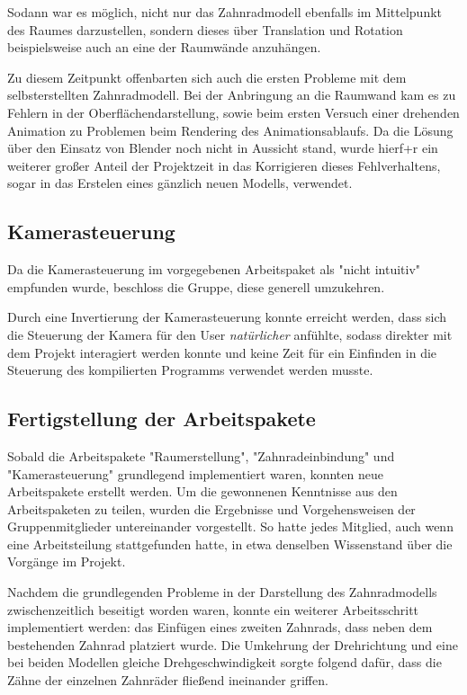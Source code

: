 \documentclass{article}
\begin{document}
Sodann war es möglich, nicht nur das Zahnradmodell ebenfalls im Mittelpunkt des Raumes darzustellen, sondern dieses über Translation und Rotation beispielsweise auch an eine der Raumwände anzuhängen. 

Zu diesem Zeitpunkt offenbarten sich auch die ersten Probleme mit dem selbsterstellten Zahnradmodell. 
Bei der Anbringung an die Raumwand kam es zu Fehlern in der Oberflächendarstellung, sowie beim ersten Versuch einer drehenden Animation zu Problemen beim Rendering des Animationsablaufs. 
Da die Lösung über den Einsatz von Blender noch nicht in Aussicht stand, wurde hierf+r ein weiterer großer Anteil der Projektzeit in das Korrigieren dieses Fehlverhaltens, sogar in das Erstelen eines gänzlich neuen Modells, verwendet. 



\subsection{Kamerasteuerung}
Da die Kamerasteuerung im vorgegebenen Arbeitspaket als "nicht intuitiv" empfunden wurde, beschloss die Gruppe, diese generell umzukehren. 

Durch eine Invertierung der Kamerasteuerung konnte erreicht werden, dass sich die Steuerung der Kamera für den User \textit{natürlicher} anfühlte, sodass direkter mit dem Projekt interagiert werden konnte und keine Zeit für ein Einfinden in die Steuerung des kompilierten Programms verwendet werden musste. 


\subsection{Fertigstellung der Arbeitspakete}
Sobald die Arbeitspakete "Raumerstellung", "Zahnradeinbindung" und "Kamerasteuerung" grundlegend implementiert waren, konnten neue Arbeitspakete erstellt werden. 
Um die gewonnenen Kenntnisse aus den Arbeitspaketen zu teilen, wurden die Ergebnisse und Vorgehensweisen der Gruppenmitglieder untereinander vorgestellt. 
So hatte jedes Mitglied, auch wenn eine Arbeitsteilung stattgefunden hatte, in etwa denselben Wissenstand über die Vorgänge im Projekt. 

Nachdem die grundlegenden Probleme in der Darstellung des Zahnradmodells zwischenzeitlich beseitigt worden waren, konnte ein weiterer Arbeitsschritt implementiert werden: 
das Einfügen eines zweiten Zahnrads, dass neben dem bestehenden Zahnrad platziert wurde. 
Die Umkehrung der Drehrichtung und eine bei beiden Modellen gleiche Drehgeschwindigkeit sorgte folgend dafür, dass die Zähne der einzelnen Zahnräder fließend ineinander griffen. 
\end{document}
